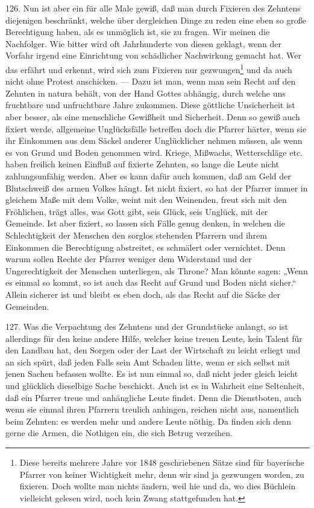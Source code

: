 126. Nun ist aber ein für alle Male gewiß, daß man durch Fixieren des Zehntens diejenigen beschränkt, welche über dergleichen Dinge zu reden eine eben so große Berechtigung haben, als es unmöglich ist, sie zu fragen. Wir meinen die Nachfolger. Wie bitter wird oft Jahrhunderte
von diesen geklagt, wenn der Vorfahr irgend eine Einrichtung von schädlicher Nachwirkung gemacht hat. Wer das erfährt und erkennt, wird sich zum Fixieren nur gezwungen\footnote{Diese bereits mehrere Jahre vor 1848 geschriebenen Sätze sind für bayerische Pfarrer von keiner Wichtigkeit mehr, denn wir sind ja gezwungen worden, zu fixieren. Doch wollte man nichts ändern, weil hie und da, wo dies Büchlein vielleicht gelesen wird, noch kein Zwang stattgefunden hat.} und da auch nicht ohne Protest anschicken. — Dazu ist man, wenn man sein Recht auf den Zehnten in natura behält, von der Hand Gottes abhängig, durch welche uns fruchtbare und unfruchtbare Jahre zukommen. Diese göttliche Unsicherheit ist aber besser, als eine menschliche Gewißheit und Sicherheit. Denn so gewiß auch fixiert werde, allgemeine Unglücksfälle betreffen doch die Pfarrer härter, wenn sie ihr Einkommen aus dem Säckel anderer Unglücklicher nehmen müssen, als wenn es von Grund und Boden genommen wird. Kriege, Mißwachs, Wetterschläge etc. haben freilich keinen Einfluß auf fixierte Zehnten, so lange die Leute nicht zahlungsunfähig werden. Aber es kann dafür auch kommen, daß am Geld der Blutschweiß des armen Volkes hängt. Ist nicht fixiert, so hat der Pfarrer immer in gleichem Maße mit dem Volke, weint mit den Weinenden, freut sich mit den Fröhlichen, trägt alles, was Gott gibt, seis Glück, seis Unglück, mit der Gemeinde. Ist aber fixiert, so lassen sich Fälle genug denken, in welchen die Schlechtigkeit der Menschen den sorglos
stehenden Pfarrern und ihrem Einkommen die Berechtigung abstreitet, es schmälert oder vernichtet. Denn warum sollen Rechte der Pfarrer weniger dem Widerstand und der Ungerechtigkeit der Menschen unterliegen, als Throne? Man könnte sagen: „Wenn es einmal so kommt, so ist auch das Recht auf Grund und Boden nicht sicher.“ Allein sicherer ist und bleibt es eben doch, als das Recht auf die Säcke der Gemeinden.

127. Was die Verpachtung des Zehntens und der Grundstücke anlangt, so ist allerdings für den keine andere Hilfe, welcher keine treuen Leute, kein Talent für den Landbau hat, den Sorgen oder der Last der Wirtschaft zu leicht erliegt und an sich spürt, daß jeden Falls sein Amt Schaden litte, wenn er sich selbst mit jenen Sachen befassen wollte. Es ist nun einmal so, daß nicht jeder gleich leicht und glücklich dieselbige Sache beschickt. Auch ist es in Wahrheit eine Seltenheit, daß ein Pfarrer treue und anhängliche Leute findet. Denn die Dienstboten, auch wenn sie einmal ihren Pfarrern treulich anhingen, reichen nicht aus, namentlich beim Zehnten: es werden mehr und andere Leute nöthig. Da finden sich denn gerne die Armen, die Nothigen ein, die sich Betrug verzeihen.

